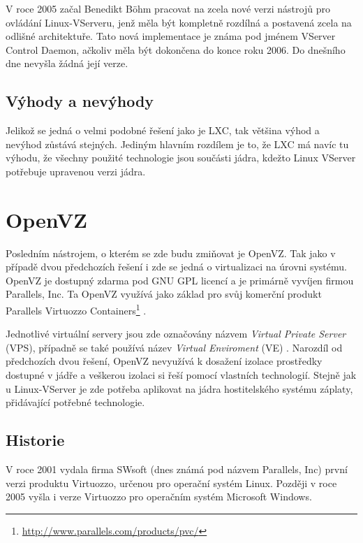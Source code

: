 V roce 2005 začal Benedikt Böhm pracovat na zcela nové verzi nástrojů pro ovládání Linux-VServeru, jenž měla být kompletně rozdílná a postavená zcela na odlišné architektuře. Tato nová implementace je známa pod jménem VServer Control Daemon, ačkoliv měla být dokončena do konce roku 2006. Do dnešního dne nevyšla žádná její verze.

\subsection{Výhody a nevýhody}

Jelikož se jedná o velmi podobné řešení jako je LXC, tak většina výhod a nevýhod zůstává stejných. Jediným hlavním rozdílem je to, že LXC má navíc tu výhodu, že všechny použité technologie jsou součásti jádra, kdežto Linux VServer potřebuje upravenou verzi jádra.

\section{OpenVZ}
Posledním nástrojem, o kterém se zde budu zmiňovat je OpenVZ. Tak jako v případě dvou předchozích řešení i zde se jedná o virtualizaci na úrovni systému. OpenVZ je dostupný zdarma pod GNU GPL licencí a je primárně vyvíjen firmou Parallels, Inc. Ta OpenVZ využívá jako základ pro svůj komerční produkt Parallels Virtuozzo Containers\footnote{\url{http://www.parallels.com/products/pvc/}} \cite{wiki:openvz}.

Jednotlivé virtuální servery jsou zde označovány názvem \emph{Virtual Private Server} (VPS), případně se také používá název \emph{Virtual Enviroment} (VE) \cite{tomecek:ovz}. Narozdíl od předchozích dvou řešení, OpenVZ nevyužívá k dosažení izolace prostředky dostupné v jádře a veškerou izolaci si řeší pomocí vlastních technologií. Stejně jak u Linux-VServer je zde potřeba aplikovat na jádra hostitelského systému záplaty, přidávající potřebné technologie.

\subsection{Historie}
V roce 2001 vydala firma SWsoft (dnes známá pod názvem Parallels, Inc) první verzi produktu Virtuozzo, určenou pro operační systém Linux. Později v roce 2005 vyšla i verze Virtuozzo pro operačním systém Microsoft Windows.
